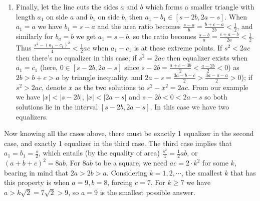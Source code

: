 \documentclass[11pt,a4paper]{article}
\newcommand{\<}{\langle}
\renewcommand{\>}{\rangle}
\begin{document}
\begin{enumerate}
\begin{enumerate}
	\item Finally, let the line cuts the sides $a$ and $b$ which forms a smaller triangle with length $a_1$ on side $a$ and $b_1$ on side $b$, then $a_1-b_1\in [s-2b, 2a-s]$. When $a_1=a$ we have $b_1=s-a$ and the area ratio becomes $\frac{s-a}{b}=\frac{b+c-a}{2b}<\frac 12$, and similarly for $b_a=b$ we get $a_1=s-b$, so the ratio becomes $\frac{s-b}{a}=\frac{c+a-b}{2a}<\frac 12$. Thus $\frac{s^2-(a_1-c_1)^2}{4}<\frac 12 ac$ when $a_1-c_1$ is at these extreme points. If $s^2<2ac$ then there's no equalizer in this case; if $s^2=2ac$ then equalizer exists when $a_1=c_1$ (here, $0\in [s-2b, 2a-s]$ since $s-2b=\frac{a+c-3b}{2}<\frac{a-2b}{2}<0$) as $2b>b+c>a$ by triangle inequality, and $2a-s=\frac{3a-b-c}{2}>\frac{3a-a-a}{2}>0$); if $s^2>2ac$, denote $x$ as the two solutions to $s^2-x^2=2ac$. From our example we have $|x|<|s-2b|$, $|x|<|2a-s|$ and $s-2b<0<2a-s$ so both solutions lie in the interval $[s-2b, 2a-s]$. In this case we have two equalizers. 
\end{enumerate}
Now knowing all the cases above, there must be exactly 1 equalizer in the second case, and exactly 1 equalizer in the third case. The third case implies that $a_1=b_1=\frac{s}{2}$, which entails (by the equality of area) $\frac{s^2}{4}=\frac 12 ab$, or $(a+b+c)^2=8ab$. For $8ab$ to be a square, we need $ac=2\cdot k^2$ for some $k$, bearing in mind that $2a>2b>a$. Considering $k=1, 2, \cdots$, the smallest $k$ that has this property is when $a=9, b=8$, forcing $c=7$. For $k\ge 7$ we have $a>k\sqrt{2}=7\sqrt{2}>9$, so $a=9$ is the smallest possible answer. 
\end{enumerate}
\end{document}
